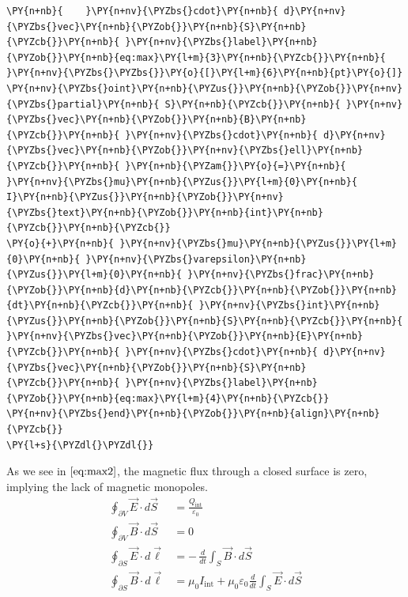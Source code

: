 \documentclass[a4paper,twoside]{article}
\begin{document}
\begin{tscode}[lang=latex, engine=pygments]
\begin{Verbatim}[commandchars=\\\{\},breaklines, breakanywhere, commandchars=\\\{\}]
\PY{n+nb}{    }\PY{n+nv}{\PYZbs{}cdot}\PY{n+nb}{ d}\PY{n+nv}{\PYZbs{}vec}\PY{n+nb}{\PYZob{}}\PY{n+nb}{S}\PY{n+nb}{\PYZcb{}}\PY{n+nb}{ }\PY{n+nv}{\PYZbs{}label}\PY{n+nb}{\PYZob{}}\PY{n+nb}{eq:max}\PY{l+m}{3}\PY{n+nb}{\PYZcb{}}\PY{n+nb}{ }\PY{n+nv}{\PYZbs{}\PYZbs{}}\PY{o}{[}\PY{l+m}{6}\PY{n+nb}{pt}\PY{o}{]}
\PY{n+nv}{\PYZbs{}oint}\PY{n+nb}{\PYZus{}}\PY{n+nb}{\PYZob{}}\PY{n+nv}{\PYZbs{}partial}\PY{n+nb}{ S}\PY{n+nb}{\PYZcb{}}\PY{n+nb}{ }\PY{n+nv}{\PYZbs{}vec}\PY{n+nb}{\PYZob{}}\PY{n+nb}{B}\PY{n+nb}{\PYZcb{}}\PY{n+nb}{ }\PY{n+nv}{\PYZbs{}cdot}\PY{n+nb}{ d}\PY{n+nv}{\PYZbs{}vec}\PY{n+nb}{\PYZob{}}\PY{n+nv}{\PYZbs{}ell}\PY{n+nb}{\PYZcb{}}\PY{n+nb}{ }\PY{n+nb}{\PYZam{}}\PY{o}{=}\PY{n+nb}{ }\PY{n+nv}{\PYZbs{}mu}\PY{n+nb}{\PYZus{}}\PY{l+m}{0}\PY{n+nb}{ I}\PY{n+nb}{\PYZus{}}\PY{n+nb}{\PYZob{}}\PY{n+nv}{\PYZbs{}text}\PY{n+nb}{\PYZob{}}\PY{n+nb}{int}\PY{n+nb}{\PYZcb{}}\PY{n+nb}{\PYZcb{}}
\PY{o}{+}\PY{n+nb}{ }\PY{n+nv}{\PYZbs{}mu}\PY{n+nb}{\PYZus{}}\PY{l+m}{0}\PY{n+nb}{ }\PY{n+nv}{\PYZbs{}varepsilon}\PY{n+nb}{\PYZus{}}\PY{l+m}{0}\PY{n+nb}{ }\PY{n+nv}{\PYZbs{}frac}\PY{n+nb}{\PYZob{}}\PY{n+nb}{d}\PY{n+nb}{\PYZcb{}}\PY{n+nb}{\PYZob{}}\PY{n+nb}{dt}\PY{n+nb}{\PYZcb{}}\PY{n+nb}{ }\PY{n+nv}{\PYZbs{}int}\PY{n+nb}{\PYZus{}}\PY{n+nb}{\PYZob{}}\PY{n+nb}{S}\PY{n+nb}{\PYZcb{}}\PY{n+nb}{ }\PY{n+nv}{\PYZbs{}vec}\PY{n+nb}{\PYZob{}}\PY{n+nb}{E}\PY{n+nb}{\PYZcb{}}\PY{n+nb}{ }\PY{n+nv}{\PYZbs{}cdot}\PY{n+nb}{ d}\PY{n+nv}{\PYZbs{}vec}\PY{n+nb}{\PYZob{}}\PY{n+nb}{S}\PY{n+nb}{\PYZcb{}}\PY{n+nb}{ }\PY{n+nv}{\PYZbs{}label}\PY{n+nb}{\PYZob{}}\PY{n+nb}{eq:max}\PY{l+m}{4}\PY{n+nb}{\PYZcb{}}
\PY{n+nv}{\PYZbs{}end}\PY{n+nb}{\PYZob{}}\PY{n+nb}{align}\PY{n+nb}{\PYZcb{}}
\PY{l+s}{\PYZdl{}\PYZdl{}}
\end{Verbatim}
\end{tscode}
As we see in $\eqref{eq:max2}$, the magnetic flux through a closed surface is zero, implying the lack of magnetic monopoles.
\begin{align}
\oint_{\partial V} \vec{E} \cdot d\vec{S} &= \frac{Q_{\text{int}}}{\varepsilon_0} \label{eq:max1} \\[6pt]
\oint_{\partial V} \vec{B} \cdot d\vec{S} &= 0 \label{eq:max2} \\[6pt]
\oint_{\partial S} \vec{E} \cdot d\vec{\ell} &= -\,\frac{d}{dt} \int_{S} \vec{B} \cdot d\vec{S} \label{eq:max3} \\[6pt]
\oint_{\partial S} \vec{B} \cdot d\vec{\ell} &= \mu_0 I_{\text{int}}
+ \mu_0 \varepsilon_0 \frac{d}{dt} \int_{S} \vec{E} \cdot d\vec{S} \label{eq:max4}
\end{align}
\end{document}
